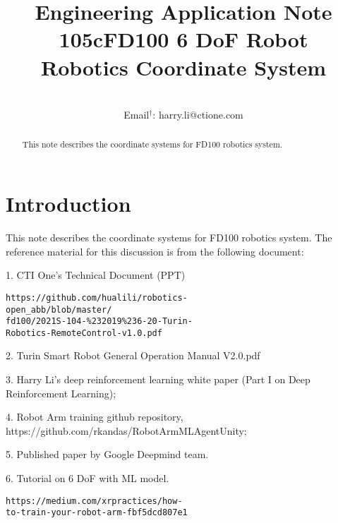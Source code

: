 \documentclass[conference]{IEEEtran}
\begin{document}
\title{{\small Engineering Application Note 105cFD100 6 DoF Robot}
\\Robotics Coordinate System  
}
 
\author{
 \\
Email$^{\dagger}$: harry.li@ctione.com\\
}

\maketitle
\begin{abstract}
This note describes the coordinate systems for FD100
robotics system.
\end{abstract}

\IEEEpeerreviewmaketitle

\section{Introduction}

This note describes the coordinate systems for FD100
robotics system. The reference material for 
this discussion is from the following document:  

1. CTI One's Technical Document (PPT)  
\begin{verbatim}
https://github.com/hualili/robotics-
open_abb/blob/master/
fd100/2021S-104-%232019%236-20-Turin-
Robotics-RemoteControl-v1.0.pdf
\end{verbatim} 

2. Turin Smart Robot General Operation Manual V2.0.pdf 

3. Harry Li's deep reinforcement learning white paper
(Part I on Deep Reinforcement Learning); 

4. Robot Arm training github repository, 
https://github.com/rkandas/RobotArmMLAgentUnity; 

5. Published paper by Google Deepmind team. 

6. Tutorial on 6 DoF with ML model. 
\begin{verbatim}
https://medium.com/xrpractices/how-
to-train-your-robot-arm-fbf5dcd807e1
\end{verbatim}
\end{document}

